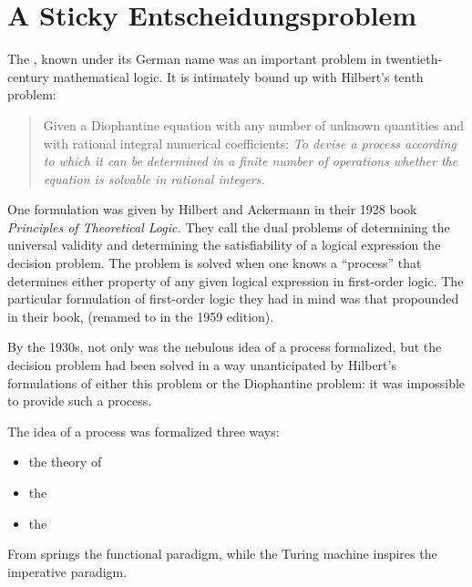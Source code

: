 \label{background:beginnings}
\section[A Sticky \foreign{Entscheidungsproblem}]{A Sticky Entscheidungsproblem}
The , known under its German name  was an important problem in twentieth-century mathematical logic. It is intimately bound up with Hilbert's tenth problem: 
\begin{quote}
Given a Diophantine equation with any number of unknown quantities and with rational integral numerical coefficients: \emph{To devise a process according to which it can be determined in a finite number of operations whether the equation is solvable in rational integers.}
\end{quote}
One formulation was given by Hilbert and Ackermann in their 1928 book \textit{Principles of Theoretical Logic.} They call the dual problems of determining the universal validity and determining the satisfiability of a logical expression the decision problem. The problem is solved when one knows a ``process'' that determines either property of any given logical expression in first-order logic. The particular formulation of first-order logic they had in mind was that propounded in their book,  (renamed to  in the 1959 edition).

By the 1930s, not only was the nebulous idea of a process formalized, but the decision problem had been solved in a way unanticipated by Hilbert's formulations of either this problem or the Diophantine problem: it was impossible to provide such a process.

The idea of a process was formalized three ways:
\begin{itemize}
\item the theory of 
\item the \vocab{\lambdacalc}
\item the 
\end{itemize}
From \lambdacalc springs the functional paradigm, while the Turing machine inspires the imperative paradigm.

